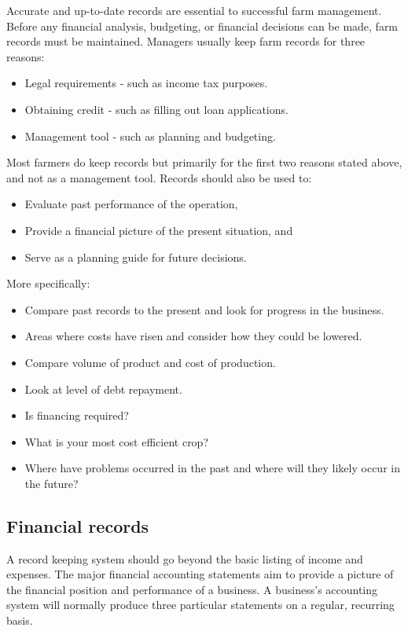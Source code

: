 \documentclass[11pt,]{book}
\providecommand{\tightlist}{%
  \setlength{\itemsep}{0pt}\setlength{\parskip}{0pt}}
\theoremstyle{definition}
\theoremstyle{definition}
\theoremstyle{definition}
\theoremstyle{remark}
\begin{document}
Accurate and up-to-date records are essential to successful farm
management. Before any financial analysis, budgeting, or financial
decisions can be made, farm records must be maintained. Managers usually
keep farm records for three reasons:

\begin{itemize}
\tightlist
\item
  Legal requirements - such as income tax purposes.
\item
  Obtaining credit - such as filling out loan applications.
\item
  Management tool - such as planning and budgeting.
\end{itemize}

Most farmers do keep records but primarily for the first two reasons
stated above, and not as a management tool. Records should also be used
to:

\begin{itemize}
\tightlist
\item
  Evaluate past performance of the operation,
\item
  Provide a financial picture of the present situation, and
\item
  Serve as a planning guide for future decisions.
\end{itemize}

More specifically:

\begin{itemize}
\tightlist
\item
  Compare past records to the present and look for progress in the
  business.
\item
  Areas where costs have risen and consider how they could be lowered.
\item
  Compare volume of product and cost of production.
\item
  Look at level of debt repayment.
\item
  Is financing required?
\item
  What is your most cost efficient crop?
\item
  Where have problems occurred in the past and where will they likely
  occur in the future?
\end{itemize}

\subsection{Financial records}\label{financial-records}

A record keeping system should go beyond the basic listing of income and
expenses. The major financial accounting statements aim to provide a
picture of the financial position and performance of a business. A
business's accounting system will normally produce three particular
statements on a regular, recurring basis.
\end{document}
